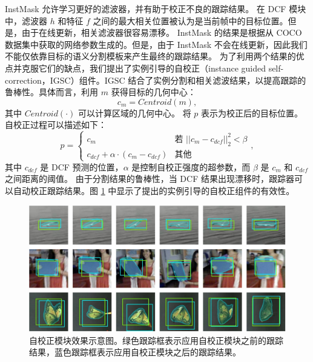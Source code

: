 InstMask 允许学习更好的滤波器，并有助于校正不良的跟踪结果。
在 DCF 模块中，滤波器 $h$ 和特征 $f$ 之间的最大相关位置被认为是当前帧中的目标位置。但是，由于在线更新，相关滤波器很容易漂移。
InstMask 的结果是根据从 COCO 数据集中获取的网络参数生成的。但是，由于 InstMask 不会在线更新，因此我们不能仅依靠目标的语义分割模板来产生最终的跟踪结果。
为了利用两个结果的优点并克服它们的缺点，我们提出了实例引导的自校正（instance guided self-correction，IGSC）组件。IGSC 结合了实例分割和相关滤波结果，以提高跟踪的鲁棒性。具体而言，利用 $m$ 获得目标的几何中心：
\begin{equation}
c_{m} = Centroid(m),
\end{equation}
其中 $Centroid(\mathord{\cdot})$ 可以计算区域的几何中心。
将 $p$ 表示为校正后的目标位置。
自校正过程可以描述如下：
\begin{equation}
p = \left\{ \begin{array}{ll}
 c_{m} & \textrm{若 $||c_{m}-c_{dcf}||_2^2 < \beta$}\\
 c_{dcf} + \alpha \cdot (c_{m}-c_{dcf}) & \textrm{其他}
 \end{array} \right.,
\end{equation}
其中 $c_{dcf}$ 是 DCF 预测的位置，$\alpha$ 是控制自校正强度的超参数，而 $\beta$ 是 $c_{m}$ 和 $c_{dcf}$ 之间距离的阈值。
由于分割结果的鲁棒性，当 DCF 结果出现漂移时，跟踪器可以自动校正跟踪结果。图 \ref{fig:IGSC} 中显示了提出的实例引导的自校正组件的有效性。

\begin{figure}
\centering
\includegraphics[width=1.0\textwidth]{Img/IGCF/cog.pdf}
\caption{自校正模块效果示意图。绿色跟踪框表示应用自校正模块之前的跟踪结果，蓝色跟踪框表示应用自校正模块之后的跟踪结果。}
\label{fig:IGSC}
\end{figure}

